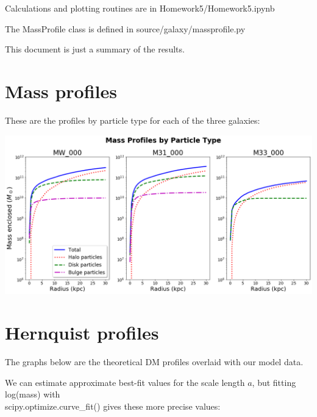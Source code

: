 

\setlength{\parskip}{0.2em}
\setlength{\skip\footins}{20pt}

\newcommand{\hmwkClass}{ASTR 400B}
\newcommand{\hmwkTitle}{Homework 5}
\newcommand{\hmwkDueDate}{Feb 20, 2020}



	
\maketitle

Calculations and plotting routines are in Homework5/Homework5.ipynb

The MassProfile class is defined in source/galaxy/massprofile.py

This document is just a summary of the results.

\section*{Mass profiles}

These are the profiles by particle type for each of the three galaxies:

{\centering \includegraphics[scale=0.45]{mass_prof} \par}


\section*{Hernquist profiles}

The graphs below are the theoretical DM profiles overlaid with our model data.

We can estimate approximate best-fit values for the scale length $a$, but fitting log(mass) with \\
scipy.optimize.curve\_fit() gives these more precise values:\vspace{5mm}

